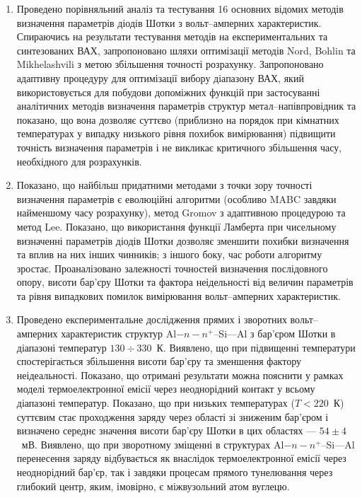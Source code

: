 \begin{enumerate}[leftmargin=0cm,itemindent=3em]
\item  Проведено порівняльний аналіз та тестування 16 основних відомих методів визначення параметрів діодів Шотки з вольт--амперних характеристик.
         Спираючись на результати тестування методів на експериментальних та синтезованих  ВАХ,
         запропоновано шляхи оптимізації методів Nord, Bohlin та Mikhelashvili з метою збільшення точності розрахунку.
      Запропоновано адаптивну процедуру для оптимізації вибору діапазону ВАХ, який використовується для побудови допоміжних функцій при застосуванні аналітичних методів визначення параметрів структур метал--напівпровідник та показано, що вона дозволяє суттєво (приблизно на порядок при кімнатних температурах у випадку низького рівня похибок вимірювання) підвищити точність визначення параметрів і не викликає критичного збільшення часу, необхідного для розрахунків.

   \item Показано, що найбільш придатними методами з точки зору точності визначення параметрів є еволюційні алгоритми (особливо MABC завдяки найменшому часу розрахунку), метод Gromov з адаптивною процедурою та метод Lee.
    Показано, що використання функції Ламберта при чисельному визначенні параметрів діодів Шотки дозволяє зменшити похибки визначення та вплив на них інших чинників; з іншого боку, час роботи алгоритму зростає.
    Проаналізовано залежності точностей визначення послідовного опору, висоти бар'єру Шотки та фактора неідельності від величин параметрів та рівня випадкових помилок вимірювання вольт--амперних характеристик.

   \item
Проведено експериментальне дослідження прямих і зворотних вольт--амперних характеристик структур Al$-n-n^+$--Si---Al з бар'єром Шотки в діапазоні температур $130\div330$~К.
Виявлено, що при підвищенні температури спостерігається збільшення висоти бар'єру та зменшення фактору неідеальності.
       Показано, що отримані результати можна пояснити у рамках моделі термоелектронної емісії через неоднорідний контакт у всьому діапазоні температур.
         Показано, що при низьких температурах ($T<220$~К) суттєвим стає проходження заряду через області зі зниженим бар'єром і визначено середнє значення висоти бар'єру Шотки в цих областях --- $54\pm4$~мВ.
     Виявлено, що при зворотному зміщенні в структурах Al$-n-n^+$--Si---Al перенесення заряду відбувається як внаслідок термоелектронної емісії через неоднорідний бар'єр, так і завдяки процесам прямого тунелювання через глибокий центр,
          яким, імовірно, є міжвузольний атом вуглецю.


\end{enumerate}
